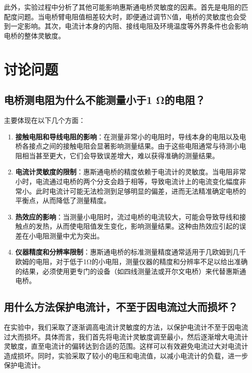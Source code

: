 \documentclass{ctexart}
\begin{document}
此外，实验过程中分析了其他可能影响惠斯通电桥灵敏度的因素。首先是电阻的匹配度问题。当电桥臂电阻值相差较大时，即便通过调节N值，电桥的灵敏度也会受到一定影响。其次，电流计本身的内阻、接线电阻及环境温度等外界条件也会影响电桥的整体灵敏度。

\section{讨论问题}

\subsection{电桥测电阻为什么不能测量小于1 Ω的电阻？}

主要体现在以下几个方面：

\begin{enumerate}
    \item \textbf{接触电阻和导线电阻的影响}：在测量非常小的电阻时，导线本身的电阻以及电桥各接点之间的接触电阻会显著影响测量结果。由于这些电阻通常与待测小电阻相当甚至更大，它们会导致误差增大，难以获得准确的测量结果。
    \item \textbf{电流计灵敏度的限制}：惠斯通电桥的精度依赖于电流计的灵敏度。当电阻非常小时，电流通过电桥的两个分支会趋于相等，导致电流计上的电流变化幅度非常小。此时电流计可能无法检测到足够明显的偏差，进而无法精准确定电桥的平衡点，从而降低了测量精度。
    \item \textbf{热效应的影响}：当测量小电阻时，流过电桥的电流较大，可能会导致导线和接触点的发热，从而使电阻值发生变化，影响测量结果。这种由热效应引起的误差在小电阻测量中尤为突出。
    \item \textbf{仪器精度和分辨率限制}：惠斯通电桥的标准测量精度通常适用于几欧姆到几千欧姆的电阻，对于低于1Ω的小电阻，测量仪器的精度和分辨率不足以给出准确的结果，必须使用更专门的设备（如四线测量法或开尔文电桥）来代替惠斯通电桥。
\end{enumerate}

\subsection{用什么方法保护电流计，不至于因电流过大而损坏？}

在实验中，我们采取了逐渐调高电流计灵敏度的方法，以保护电流计不至于因电流过大而损坏。具体而言，我们首先将电流计灵敏度调至最小，然后逐渐增大电流计灵敏度，直至电流计的偏转达到合适的范围。这样可以有效避免电流过大对电流计造成损坏。同时，实验采取了较小的电压和电流值，以减小电流计的负载，进一步保护电流计。
\end{document}
